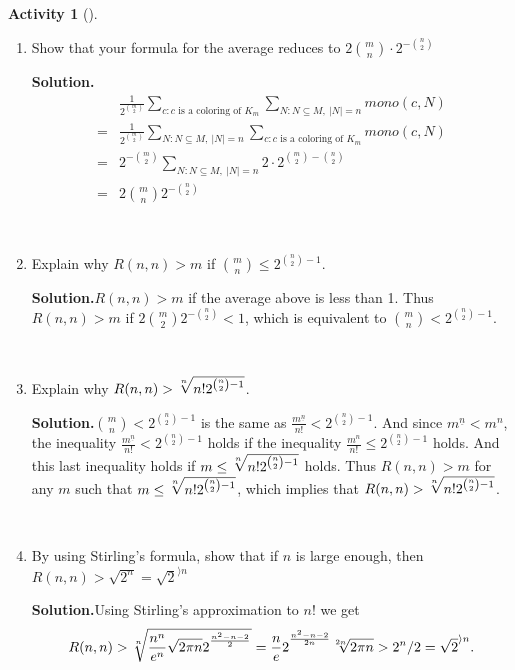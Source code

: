 \documentclass[10pt,]{book}
\theoremstyle{plain}
\theoremstyle{definition}
\newtheorem{activity}[project]{Activity}
\numberwithin{equation}{chapter}
\newcommand{\lt}{<}
\newcommand{\amp}{&}
\begin{document}
\begin{activity}[]
\begin{enumerate}[label=(\alph*)]
~\par
\item Show that your formula for the average reduces to \(2\binom{m}{n}\cdot2^{-\binom{n}{2}}\)%
\par\medskip\noindent%
\textbf{Solution.}\quad %
\begin{align*}
\amp \frac{1}{2^{\binom{m}{2}}}\sum_{c:c\mbox{~is a coloring
of~} K_m}\sum_{N:N\subseteq M,~|N|=n}{ mono}(c,N)\\
=\amp \frac{1}{2^{\binom{m}{2}}} \sum_{N:N\subseteq
M,~|N|=n}\sum_{c:c\mbox{~is a coloring of~} K_m}{ mono}(c,N)\\
=\amp
2^{-\binom{m}{2}}\sum_{N:N\subseteq
M,~|N|=n}2\cdot2^{\binom{m}{2}-\binom{n}{2}}\\
=\amp  2\binom{m}{n}2^{-\binom{n}{2}}
\end{align*}

~\par
\item Explain why \(R(n,n)>m\) if \(\binom{m}{n}\le 2^{\binom{n}{2} -1}\).%
\par\medskip\noindent%
\textbf{Solution.}\quad \(R(n,n)>m\) if the average above is less than 1. Thus \(R(n,n)>m\) if \(2\binom{m}{2}2^{-\binom{n}{2}}\lt 1\), which is equivalent to \(\binom{m}{n}\lt 2^{\binom{n}{2}-1}\).%

~\par
\item Explain why \(R(n,n)>\root n \of {n!2^{\binom{n}{2}-1}}\).%
\par\medskip\noindent%
\textbf{Solution.}\quad \(\binom{m}{n} \lt 2^{\binom{n}{2}-1}\) is the same as \(\frac{m^{\underline{n}}}{n!}\lt 2^{\binom{n}{2}-1}\). And since \(m^{\underline{n}}\lt m^n\), the inequality \(\frac{m^{\underline{n}}}{n!}\lt  2^{\binom{n}{2}-1}\) holds if the inequality \(\frac{m^n}{n!}\le2^{\binom{n}{2}-1}\) holds. And this last inequality holds if \(m\le\root n
\of {n!2^{\binom{n}{2}-1}}\) holds. Thus \(R(n,n)>m\) for any \(m\) such that \(m\le\root n
\of {n!2^{\binom{n}{2}-1}}\), which implies that \(R(n,n)> \root n
\of {n!2^{\binom{n}{2}-1}}\).%

~\par
\item By using Stirling's formula, show that if \(n\) is large enough, then \(R(n,n) > \sqrt{2^n} = \sqrt{2}^{\rangle n}\)%
\par\medskip\noindent%
\textbf{Solution.}\quad Using Stirling's approximation to \(n!\) we get%
\begin{equation*}
R(n,n)>\root n \of
{\frac{n^n}{e^n}\sqrt{2\pi n}2^{^\frac{n^2-n-2}{2}}}=\frac{n}{e}2^{^\frac{n^2-n-2}{2n}}\root 2n \of{2\pi
n}>2^n/2=\sqrt{2}^{\rangle n}.
\end{equation*}
%

\end{enumerate}
\end{activity}
\typeout{************************************************}
\typeout{************************************************}
\end{document}
